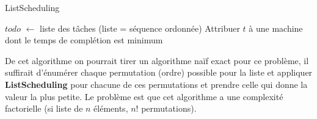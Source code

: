 \documentclass[12pt]{article}
\begin{document}
\begin{algorithm}[h!]
\caption{ListScheduling}
\begin{algorithmic}[1]
\STATE $todo$ $\leftarrow$ liste des tâches (liste = séquence ordonnée)
\STATE Attribuer $t$ à une machine dont le temps de complétion est minimum
\ENDFOR
\end{algorithmic}
\end{algorithm}

De cet algorithme on pourrait tirer un algorithme naïf exact pour ce problème, il suffirait d'énumérer chaque permutation (ordre) possible
pour la liste et appliquer \textbf{ListScheduling} pour chacune de ces permutations et prendre celle qui donne la valeur la plus petite. Le
problème est que cet algorithme a une complexité factorielle (si liste de $n$ éléments, $n!$ permutations).
\end{document}
